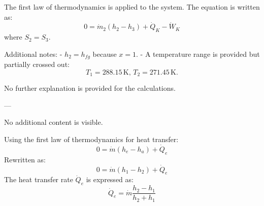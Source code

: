 The first law of thermodynamics is applied to the system. The equation is written as:  
\[
0 = \dot{m}_2 \left( h_2 - h_3 \right) + \dot{Q}_K - \dot{W}_K
\]  
where \( S_2 = S_3 \).  

Additional notes:  
- \( h_2 = h_{fg} \) because \( x = 1 \).  
- A temperature range is provided but partially crossed out:  
  \[
  T_1 = 288.15 \, \text{K}, \, T_2 = 271.45 \, \text{K}.
  \]  

No further explanation is provided for the calculations.  

--- 

No additional content is visible.

Using the first law of thermodynamics for heat transfer:  
\[
0 = \dot{m} (h_e - h_a) + \dot{Q}_e
\]  
Rewritten as:  
\[
0 = \dot{m} (h_1 - h_2) + \dot{Q}_e
\]  
The heat transfer rate \( \dot{Q}_e \) is expressed as:  
\[
\dot{Q}_e = \dot{m} \frac{h_2 - h_1}{h_2 + h_1}
\]